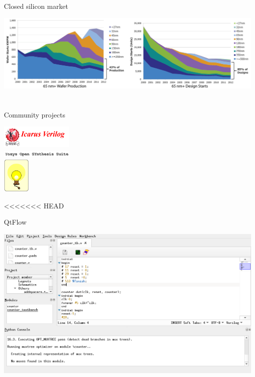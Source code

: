 \documentclass[9pt]{beamer}
\begin{document}
\begin{frame}{Closed silicon market}
	\begin{center}
		\hspace*{-0.3in}
		\includegraphics[width=1.15\textwidth]{market-closing.png} \\
	\end{center}
	
\end{frame}

\section[Who]{}
\begin{frame}{Community projects}
	\begin{center}
		\includegraphics[width=100pt]{Icarus.png} \\
		\includegraphics[width=100pt]{Yosys.png} \\
		\includegraphics[height=50pt]{Opencircuit.png}
	\end{center}
\end{frame}

<<<<<<< HEAD
\begin{frame}{QtFlow}
	\begin{center}
		\hspace*{-0.3in}
		\includegraphics[width=1.15\textwidth]{qtflow1.png} \\
	\end{center}
\end{frame}
\end{document}

